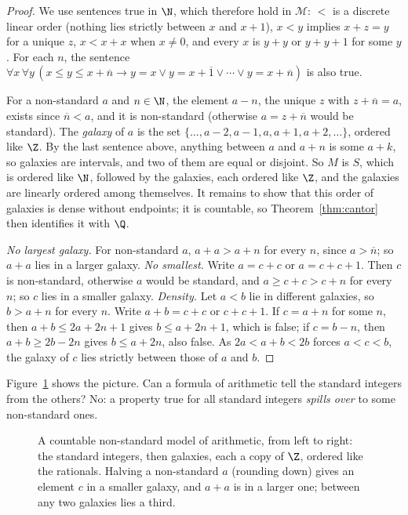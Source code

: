 \begin{proof}
We use sentences true in $\N$, which therefore hold in $\mathcal M$: $<$ is a discrete linear order (nothing lies strictly between $x$ and $x+1$), $x<y$ implies $x+z=y$ for a unique $z$, $x<x+x$ when $x\ne0$, and every $x$ is $y+y$ or $y+y+1$ for some $y$. For each $n$, the sentence $\forall x\,\forall y\,(x\le y\le x+\overline n\to y=x\lor y=x+\overline1\lor\cdots\lor y=x+\overline n)$ is also true.

For a non-standard $a$ and $n\in\N$, the element $a-n$, the unique $z$ with $z+\overline n=a$, exists since $\overline n<a$, and it is non-standard (otherwise $a=z+\overline n$ would be standard). The \emph{galaxy} of $a$ is the set $\{\dots,a-2,a-1,a,a+1,a+2,\dots\}$, ordered like $\Z$. By the last sentence above, anything between $a$ and $a+n$ is some $a+k$, so galaxies are intervals, and two of them are equal or disjoint. So $M$ is $S$, which is ordered like $\N$, followed by the galaxies, each ordered like $\Z$, and the galaxies are linearly ordered among themselves. It remains to show that this order of galaxies is dense without endpoints; it is countable, so Theorem~\ref{thm:cantor} then identifies it with $\Q$.

\emph{No largest galaxy.} For non-standard $a$, $a+a>a+n$ for every $n$, since $a>\overline n$; so $a+a$ lies in a larger galaxy. \emph{No smallest.} Write $a=c+c$ or $a=c+c+1$. Then $c$ is non-standard, otherwise $a$ would be standard, and $a\ge c+c>c+n$ for every $n$; so $c$ lies in a smaller galaxy. \emph{Density.} Let $a<b$ lie in different galaxies, so $b>a+n$ for every $n$. Write $a+b=c+c$ or $c+c+1$. If $c=a+n$ for some $n$, then $a+b\le 2a+2n+1$ gives $b\le a+2n+1$, which is false; if $c=b-n$, then $a+b\ge 2b-2n$ gives $b\le a+2n$, also false. As $2a<a+b<2b$ forces $a<c<b$, the galaxy of $c$ lies strictly between those of $a$ and $b$.
\end{proof}

Figure~\ref{fig:nonstandard} shows the picture. Can a formula of arithmetic tell the standard integers from the others? No: a property true for all standard integers \emph{spills over} to some non-standard ones.

\begin{figure}[ht]
\centering
{}
\caption{A countable non-standard model of arithmetic, from left to right: the standard integers, then galaxies, each a copy of $\Z$, ordered like the rationals. Halving a non-standard $a$ (rounding down) gives an element $c$ in a smaller galaxy, and $a+a$ is in a larger one; between any two galaxies lies a third.}
\label{fig:nonstandard}
\end{figure}


